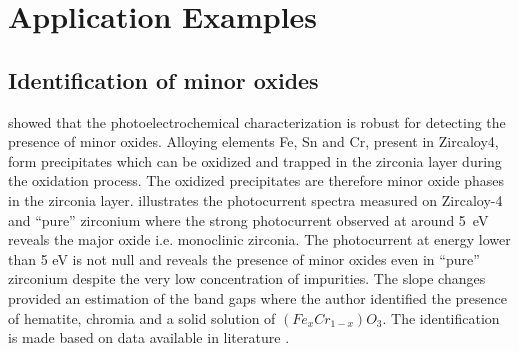 \section{Application Examples}

\subsection{Identification of minor oxides}
    \citet{benaboud2007} showed that the photoelectrochemical characterization 
    is robust for detecting the presence of minor oxides. 
    Alloying elements Fe, Sn and Cr, present in Zircaloy4, form precipitates 
    which can be oxidized and trapped in the zirconia layer during the 
    oxidation process. 
    The oxidized precipitates are therefore minor oxide phases in the zirconia 
    layer. 
     illustrates the photocurrent spectra measured on Zircaloy-4 
    and “pure” zirconium where the strong photocurrent observed at around 5~eV 
    reveals the major oxide i.e. monoclinic zirconia. 
    The photocurrent at energy lower than 5 eV is not null and reveals the 
    presence of minor oxides even in “pure” zirconium despite the very low 
    concentration of impurities. 
    The slope changes provided an estimation of the band gaps where the author 
    identified the presence of hematite, chromia and a solid solution of 
    $(Fe_xCr_{1-x})O_3$. 
    The identification is made based on data available in literature \citep{morrison1980}.

